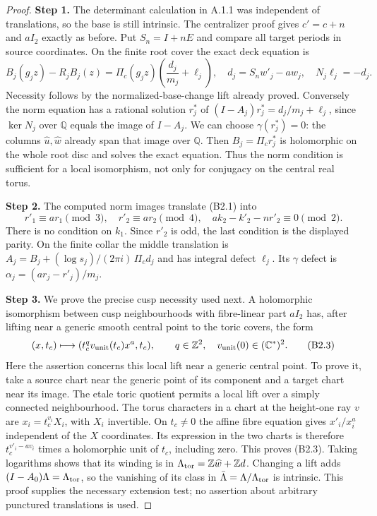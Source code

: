 \documentclass[11pt,a4paper]{article}
\theoremstyle{plain}
\theoremstyle{definition}
\begin{document}
\begin{proof}
\par\smallskip\noindent\textbf{Step 1.} The determinant calculation in A.1.1 was independent of translations, so the base is still intrinsic. The centralizer proof gives $c'=c+n$ and $aI_2$ exactly as before. Put $S_n=I+nE$ and compare all target periods in source coordinates. On the finite root cover the exact deck equation is
\[
 B_j(g_jz)-R_jB_j(z)=\Pi_c(g_jz)\left(\frac{d_j}{m_j}+\ell_j\right),
 \quad d_j=S_nw'_j-a w_j,
 \quad N_j\ell_j=-d_j.                                      \tag{B2.1}
\]
Necessity follows by the normalized-base-change lift already proved. Conversely the norm equation has a rational solution $r_j^*$ of
$(I-A_j)r_j^*=d_j/m_j+\ell_j$, since $\ker N_j$ over $\mathbb Q$ equals the image of $I-A_j$. We can choose $\gamma(r_j^*)=0$: the columns $\widehat u,\widehat w$ already span that image over $\mathbb Q$. Then $B_j=\Pi_cr_j^*$ is holomorphic on the whole root disc and solves the exact equation. Thus the norm condition is sufficient for a local isomorphism, not only for conjugacy on the central real torus.

\par\smallskip\noindent\textbf{Step 2.} The computed norm images translate (B2.1) into
\[
 r'_1\equiv ar_1\pmod3,\quad r'_2\equiv ar_2\pmod4,
 \quad ak_2-k'_2-nr'_2\equiv0\pmod2.                       \tag{B2.2}
\]
There is no condition on $k_1$. Since $r'_2$ is odd, the last condition is the displayed parity. On the finite collar the middle translation is
$A_j=B_j+(\log s_j)/(2\pi i)\,\Pi_cd_j$ and has integral defect $\ell_j$. Its $\gamma$ defect is
$\alpha_j=(ar_j-r'_j)/m_j$.

\par\smallskip\noindent\textbf{Step 3.} We prove the precise cusp necessity used next. A holomorphic isomorphism between cusp neighbourhoods with fibre-linear part $aI_2$ has, after lifting near a generic smooth central point to the toric covers, the form
\[
 (x,t_c)\longmapsto(t_c^q v_{\rm unit}(t_c)x^a,t_c),\qquad q\in\mathbb Z^2,
 \quad v_{\rm unit}(0)\in(\mathbb C^*)^2.                           \tag{B2.3}
\]
Here the assertion concerns this local lift near a generic central point. To prove it, take a source chart near the generic point of its component and a target chart near its image. The etale toric quotient permits a local lift over a simply connected neighbourhood. The torus characters in a chart at the height-one ray $v$ are $x_i=t_c^{v_i}X_i$, with $X_i$ invertible. On $t_c\ne0$ the affine fibre equation gives $x'_i/x_i^a$ independent of the $X$ coordinates. Its expression in the two charts is therefore $t_c^{v'_i-av_i}$ times a holomorphic unit of $t_c$, including zero. This proves (B2.3). Taking logarithms shows that its winding is in $\Lambda_{\rm tor}=\mathbb Z\widehat w+\mathbb Zd$. Changing a lift adds $(I-A_0)\Lambda=\Lambda_{\rm tor}$, so the vanishing of its class in $\bar\Lambda=\Lambda/\Lambda_{\rm tor}$ is intrinsic. This proof supplies the necessary extension test; no assertion about arbitrary punctured translations is used.


\end{proof}
\end{document}
